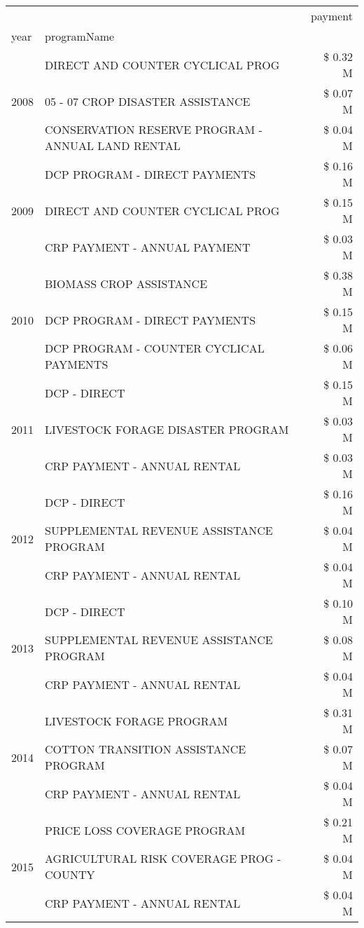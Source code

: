 \begin{tabular}{llr}
\toprule
 &  & payment \\
year & programName &  \\
\midrule
\multirow[t]{3}{*}{2008} & DIRECT AND COUNTER CYCLICAL PROG & \$ 0.32 M \\
 & 05 - 07 CROP DISASTER ASSISTANCE & \$ 0.07 M \\
 & CONSERVATION RESERVE PROGRAM - ANNUAL LAND RENTAL & \$ 0.04 M \\
\cline{1-3}
\multirow[t]{3}{*}{2009} & DCP PROGRAM - DIRECT PAYMENTS & \$ 0.16 M \\
 & DIRECT AND COUNTER CYCLICAL PROG & \$ 0.15 M \\
 & CRP PAYMENT - ANNUAL PAYMENT & \$ 0.03 M \\
\cline{1-3}
\multirow[t]{3}{*}{2010} & BIOMASS CROP ASSISTANCE & \$ 0.38 M \\
 & DCP PROGRAM - DIRECT PAYMENTS & \$ 0.15 M \\
 & DCP PROGRAM - COUNTER CYCLICAL PAYMENTS & \$ 0.06 M \\
\cline{1-3}
\multirow[t]{3}{*}{2011} & DCP - DIRECT & \$ 0.15 M \\
 & LIVESTOCK FORAGE DISASTER PROGRAM & \$ 0.03 M \\
 & CRP PAYMENT - ANNUAL RENTAL & \$ 0.03 M \\
\cline{1-3}
\multirow[t]{3}{*}{2012} & DCP - DIRECT & \$ 0.16 M \\
 & SUPPLEMENTAL REVENUE ASSISTANCE PROGRAM & \$ 0.04 M \\
 & CRP PAYMENT - ANNUAL RENTAL & \$ 0.04 M \\
\cline{1-3}
\multirow[t]{3}{*}{2013} & DCP - DIRECT & \$ 0.10 M \\
 & SUPPLEMENTAL REVENUE ASSISTANCE PROGRAM & \$ 0.08 M \\
 & CRP PAYMENT - ANNUAL RENTAL & \$ 0.04 M \\
\cline{1-3}
\multirow[t]{3}{*}{2014} & LIVESTOCK FORAGE PROGRAM & \$ 0.31 M \\
 & COTTON TRANSITION ASSISTANCE PROGRAM & \$ 0.07 M \\
 & CRP PAYMENT - ANNUAL RENTAL & \$ 0.04 M \\
\cline{1-3}
\multirow[t]{3}{*}{2015} & PRICE LOSS COVERAGE PROGRAM & \$ 0.21 M \\
 & AGRICULTURAL RISK COVERAGE PROG - COUNTY & \$ 0.04 M \\
 & CRP PAYMENT - ANNUAL RENTAL & \$ 0.04 M \\
\cline{1-3}

\end{tabular}
